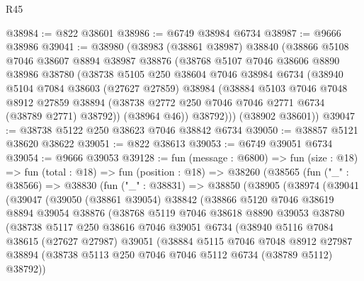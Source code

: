 \begin{lexlean}{R45}
\begin{coremodule}
{@38984 := @822 @38601
@38986 := @6749 @38984 @6734
@38987 := @9666 @38986
@39041 := @38980
    (@38983
      (@38861 @38987)
      @38840
      (@38866
        @5108
        @7046
        @38607
        @8894
        @38987
        @38876
        (@38768
          @5107
          @7046
          @38606
          @8890
          @38986
          @38780
          (@38738
            @5105
            @250
            @38604
            @7046
            @38984
            @6734
            (@38940
              @5104
              @7084
              @38603
              (@27627 @27859)
              @38984
              (@38884
                @5103
                @7046
                @7048
                @8912
                @27859
                @38894
                (@38738 @2772 @250 @7046 @7046 @2771 @6734 (@38789 @2771) @38792))
              (@38964 @46))
            @38792)))
      (@38902 @38601))
@39047 := @38738 @5122 @250 @38623 @7046 @38842 @6734
@39050 := @38857 @5121 @38620 @38622
@39051 := @822 @38613
@39053 := @6749 @39051 @6734
@39054 := @9666 @39053
@39128 := fun (message : @6800) =>
  fun (size : @18) =>
  fun (total : @18) =>
  fun (position : @18) =>
  @38260
    (@38565
      (fun ("_" : @38566) =>
      @38830
        (fun ("_" : @38831) =>
        @38850
          (@38905
            (@38974
              (@39041
                (@39047
                  (@39050
                    (@38861 @39054)
                    @38842
                    (@38866
                      @5120
                      @7046
                      @38619
                      @8894
                      @39054
                      @38876
                      (@38768
                        @5119
                        @7046
                        @38618
                        @8890
                        @39053
                        @38780
                        (@38738
                          @5117
                          @250
                          @38616
                          @7046
                          @39051
                          @6734
                          (@38940
                            @5116
                            @7084
                            @38615
                            (@27627 @27987)
                            @39051
                            (@38884
                              @5115
                              @7046
                              @7048
                              @8912
                              @27987
                              @38894
                              (@38738 @5113 @250 @7046 @7046 @5112 @6734 (@38789 @5112) @38792))
}
\end{coremodule}
\end{lexlean}
